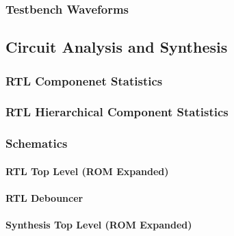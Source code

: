 \documentclass[11pt]{article}
\begin{document}
\subsubsection*{Testbench Waveforms}




\subsection*{Circuit Analysis and Synthesis}

\subsubsection*{RTL Componenet Statistics}

\subsubsection*{RTL Hierarchical Component Statistics}

\subsubsection*{Schematics}

\paragraph*{RTL Top Level (ROM Expanded)}

\paragraph*{RTL Debouncer}

\paragraph*{Synthesis Top Level (ROM Expanded)}
\end{document}
